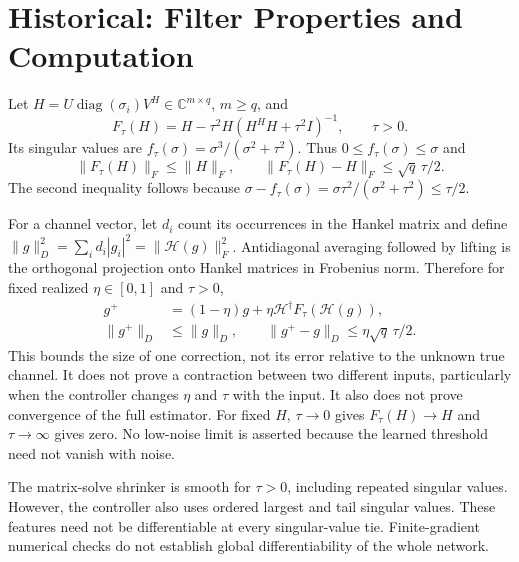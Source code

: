 \documentclass[journal]{IEEEtran}
\newcommand{\Hank}{\mathcal H}
\DeclareMathOperator{\diag}{diag}
\begin{document}
\section{Historical: Filter Properties and Computation}
Let $H=U\diag(\sigma_i)V^H\in\mathbb C^{m\times q}$, $m\ge q$, and
\begin{equation}
 F_\tau(H)=H-\tau^2H(H^HH+\tau^2I)^{-1},\qquad\tau>0.
\end{equation}
Its singular values are $f_\tau(\sigma)=\sigma^3/(\sigma^2+\tau^2)$.
Thus $0\le f_\tau(\sigma)\le\sigma$ and
\begin{equation}
 \|F_\tau(H)\|_F\le\|H\|_F,\qquad
 \|F_\tau(H)-H\|_F\le\sqrt q\,\tau/2.
\end{equation}
The second inequality follows because
$\sigma-f_\tau(\sigma)=\sigma\tau^2/(\sigma^2+\tau^2)\le\tau/2$.

For a channel vector, let $d_i$ count its occurrences in the Hankel
matrix and define $\|g\|_D^2=\sum_i d_i|g_i|^2=\|\Hank(g)\|_F^2$.
Antidiagonal averaging followed by lifting is the orthogonal projection
onto Hankel matrices in Frobenius norm. Therefore for fixed realized
$\eta\in[0,1]$ and $\tau>0$,
\begin{align}
 g^+&=(1-\eta)g+\eta\Hank^\dagger F_\tau(\Hank(g)),\\
 \|g^+\|_D&\le\|g\|_D,\qquad
 \|g^+-g\|_D\le\eta\sqrt q\,\tau/2.
\end{align}
This bounds the size of one correction, not its error relative to the
unknown true channel. It does not prove a contraction between two
different inputs, particularly when the controller changes $\eta$ and
$\tau$ with the input. It also does not prove convergence of the full
estimator. For fixed $H$, $\tau\to0$ gives $F_\tau(H)\to H$ and
$\tau\to\infty$ gives zero. No low-noise limit is asserted because
the learned threshold need not vanish with noise.

The matrix-solve shrinker is smooth for $\tau>0$, including repeated
singular values. However, the controller also uses ordered largest and
tail singular values. These features need not be differentiable at every
singular-value tie. Finite-gradient numerical checks do not establish
global differentiability of the whole network.
\end{document}
